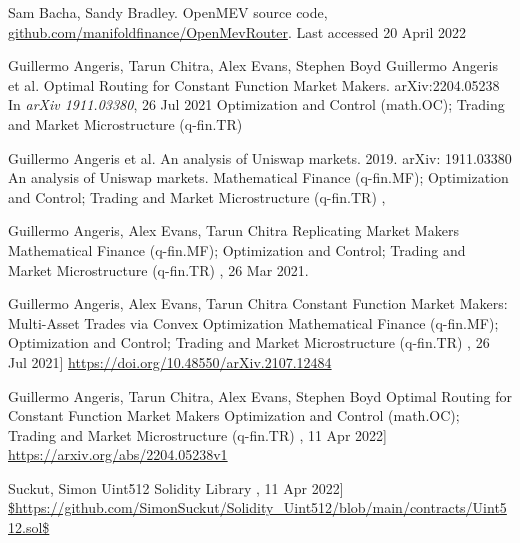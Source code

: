 \documentclass[runningheads]{llncs}
\begin{document}
\begin{thebibliography}{1}
	Sam Bacha, Sandy Bradley.
	OpenMEV source code, \url{github.com/manifoldfinance/OpenMevRouter}.
	Last accessed 20 April 2022
	
	\newline
	Guillermo Angeris, Tarun Chitra, Alex Evans, Stephen Boyd
	\newblock Guillermo Angeris et al. Optimal Routing for Constant Function Market Makers.	arXiv:2204.05238
	\newblock In {\em arXiv 1911.03380}, 26 Jul 2021
	Optimization and Control (math.OC); Trading and Market Microstructure (q-fin.TR)

	\hfill \break
	Guillermo Angeris et al. An analysis of Uniswap markets. 2019. arXiv: 1911.03380
	\newblock An analysis of Uniswap markets.
	Mathematical Finance (q-fin.MF); Optimization and Control; Trading and Market Microstructure (q-fin.TR)
	,

	\hfill \break
	Guillermo Angeris, Alex Evans, Tarun Chitra
	\newblock Replicating Market Makers
	Mathematical Finance (q-fin.MF); Optimization and Control; Trading and Market Microstructure (q-fin.TR)
	, 26 Mar 2021.

	\hfill \break
	Guillermo Angeris, Alex Evans, Tarun Chitra
	\newblock Constant Function Market Makers: Multi-Asset Trades via Convex Optimization
	Mathematical Finance (q-fin.MF); Optimization and Control; Trading and Market Microstructure (q-fin.TR)
	, 26 Jul 2021]
	\url{https://doi.org/10.48550/arXiv.2107.12484}

	\hfill \break
	Guillermo Angeris, Tarun Chitra, Alex Evans, Stephen Boyd
	\newblock Optimal Routing for Constant Function Market Makers
	Optimization and Control (math.OC); Trading and Market Microstructure (q-fin.TR)
	, 11 Apr 2022]
	\url{https://arxiv.org/abs/2204.05238v1}

	\hfill \break
	Suckut, Simon
	\newblock Uint512 Solidity Library
	, 11 Apr 2022]
	\url{$https://github.com/SimonSuckut/Solidity_Uint512/blob/main/contracts/Uint512.sol$}



\end{thebibliography}
\end{document}
